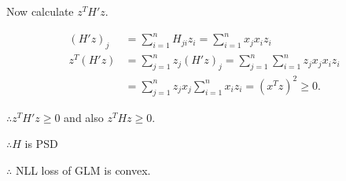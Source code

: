 \begin{answer}
Now calculate $z^T H' z$.

\begin{align*}
    (H'z)_j &= \sum_{i=1}^n H_{ji} z_i = \sum_{i=1}^n x_j x_i z_i \\
    z^T(H'z) &= \sum_{j=1}^n z_j (H' z)_j = \sum_{j=1}^n \sum_{i=1}^n z_j x_j x_i z_i \\
    &= \sum_{j=1}^n z_j x_j \sum_{i=1}^n x_i z_i = (x^T z)^2 \geq 0.
\end{align*}

$\therefore z^T H' z \geq 0$ and also $z^T H z \geq 0$.

$\therefore H$ is PSD

$\therefore$ NLL loss of GLM is convex.

\end{answer}
